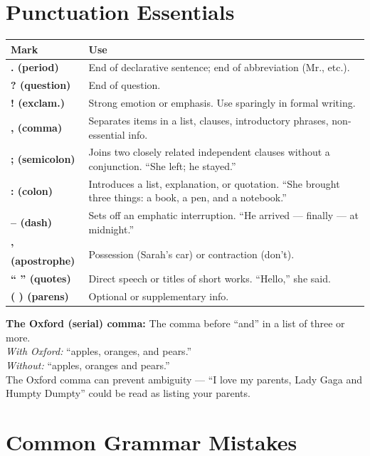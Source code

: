 \documentclass[11pt, letterpaper]{article}
\begin{document}
\section*{Punctuation Essentials}

\noindent
{\renewcommand{\arraystretch}{1.5}
\begin{tabularx}{\textwidth}{>{\bfseries\centering\arraybackslash}p{2.5cm}
                              >{\raggedright\arraybackslash}X}
\toprule
\rowcolor{tableheaderorange}
\textbf{Mark} & \textbf{Use} \\
\midrule
\rowcolor{rowOr} . (period) & End of declarative sentence; end of abbreviation (Mr., etc.). \\
\rowcolor{rowA}  ? (question) & End of question. \\
\rowcolor{rowOr} ! (exclam.) & Strong emotion or emphasis. Use sparingly in formal writing. \\
\rowcolor{rowA}  , (comma) & Separates items in a list, clauses, introductory phrases, non-essential info. \\
\rowcolor{rowOr} ; (semicolon) & Joins two closely related independent clauses without a conjunction. ``She left; he stayed.'' \\
\rowcolor{rowA}  : (colon) & Introduces a list, explanation, or quotation. ``She brought three things: a book, a pen, and a notebook.'' \\
\rowcolor{rowOr} -- (dash) & Sets off an emphatic interruption. ``He arrived --- finally --- at midnight.'' \\
\rowcolor{rowA}  ' (apostrophe) & Possession (Sarah's car) or contraction (don't). \\
\rowcolor{rowOr} `` '' (quotes) & Direct speech or titles of short works. ``Hello,'' she said. \\
\rowcolor{rowA}  ( ) (parens) & Optional or supplementary info. \\
\bottomrule
\end{tabularx}}

\textbf{The Oxford (serial) comma:} The comma before ``and'' in a list of three or more.\\
\quad \textit{With Oxford:} ``apples, oranges, and pears.''\\
\quad \textit{Without:} ``apples, oranges and pears.''\\
The Oxford comma can prevent ambiguity --- ``I love my parents, Lady Gaga and Humpty Dumpty'' could be read as listing your parents.

\section*{Common Grammar Mistakes}
\end{document}
